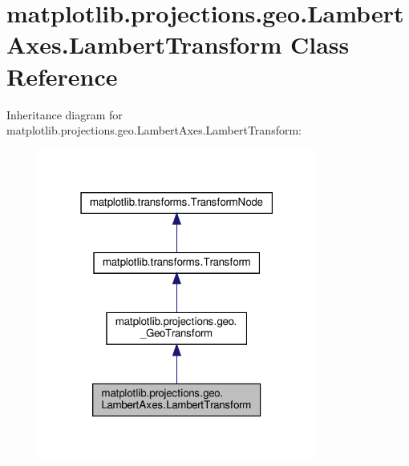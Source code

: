 \hypertarget{classmatplotlib_1_1projections_1_1geo_1_1LambertAxes_1_1LambertTransform}{}\section{matplotlib.\+projections.\+geo.\+Lambert\+Axes.\+Lambert\+Transform Class Reference}
\label{classmatplotlib_1_1projections_1_1geo_1_1LambertAxes_1_1LambertTransform}


Inheritance diagram for matplotlib.\+projections.\+geo.\+Lambert\+Axes.\+Lambert\+Transform\+:
\nopagebreak
\begin{figure}[H]
\begin{center}
\leavevmode
\includegraphics[width=259pt]{classmatplotlib_1_1projections_1_1geo_1_1LambertAxes_1_1LambertTransform__inherit__graph}
\end{center}
\end{figure}


